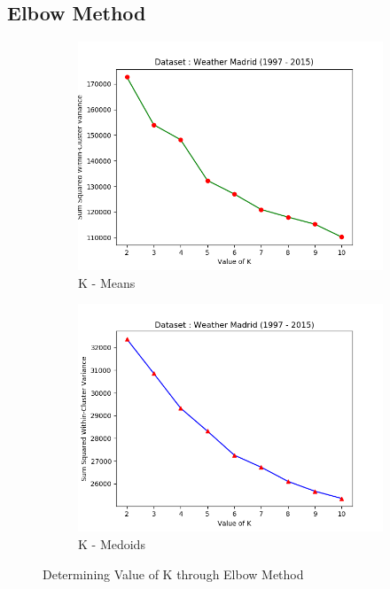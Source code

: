 \documentclass[12pt]{article}
\begin{document}
\subsection{Elbow Method}

\begin{figure}[H]
	\centering
	\begin{subfigure}{0.5\linewidth}
		\includegraphics[scale=0.55]{Elbow_Weather.png}
		\caption{K - Means}
		\label{fig:elbow_weather}
	\end{subfigure}%
	\begin{subfigure}{0.5\linewidth}
		\includegraphics[scale=0.55]{k_medoids_elbow_weather.png}
		\caption{K - Medoids}
		\label{fig:elbow_w_medoid}
	\end{subfigure}
	\caption{Determining Value of K through Elbow Method}
\end{figure}
\end{document}
